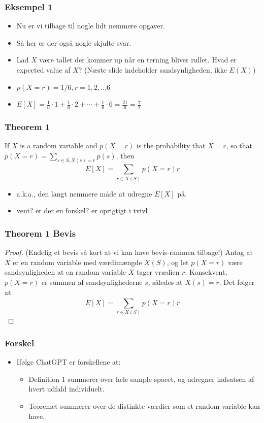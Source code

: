 \documentclass{beamer}
\begin{document}
\begin{frame}
  \frametitle{Eksempel 1}
 \begin{itemize}
 \item<1-> Nu er vi tilbage til nogle lidt nemmere opgaver. 
 \item<1-> Så her er der også nogle skjulte svar.
 \item<1-> Lad $X$ være tallet der kommer up når en terning bliver rullet. Hvad er expected value af $X$? (Næste slide indeholder sandsynligheden, ikke $E(X)$)
 \item<2-> $p(X = r) = 1/6, r = 1,2,\ldots 6$
 \item<3-> $E[X] = \frac{1}{6} \cdot 1 + \frac{1}{6} \cdot 2 + \cdots + \frac{1}{6} \cdot 6 = \frac{21}{6} = \frac{7}{2}$
 \end{itemize} 
\end{frame}


\begin{frame}
  \frametitle{Theorem 1}
 \begin{theorem}
   If $X$ is a random variable and $p(X = r)$ is the probability that $X = r$, so that $p(X=r) = \sum_{s \in S, X(s)=r} p(s)$, then
   \[ E[X] = \sum_{r \in X(S)}^{} p(X=r)r  \]
 \end{theorem} 
 \begin{itemize}
 \item a.k.a., den langt nemmere måde at udregne $E[X]$ på.
 \item vent? er der en forskel? er oprigtigt i tvivl
 \end{itemize}
\end{frame}

\begin{frame}
  \frametitle{Theorem 1 Bevis}
 \begin{proof}
   (Endelig et bevis så kort at vi kan have bevis-rammen tilbage!)
   Antag at $X$ er en random variable med værdimængde $X(S)$, og let $p(X=r)$ være sandsynligheden at en random variable $X$ tager vrædien $r$. Konsekvent, $p(X=r)$ er summen af sandsynlighederne $s$, således at $X(s) = r$. Det følger at
   \[E[X] = \sum_{r \in X(S)}^{} p(X = r)r  \]
 \end{proof}
\end{frame}

\begin{frame}
  \frametitle{Forskel}
  \begin{itemize}
  \item Ifølge ChatGPT er forskellene at:
    \begin{itemize}
    \item Definition 1 summerer over hele sample spacet, og udregner indsatsen af hvert udfald individuelt.
    \item Teoremet summerer over de distinkte værdier som et random variable kan have. 
    \end{itemize}
  \end{itemize}
\end{frame}
\end{document}
